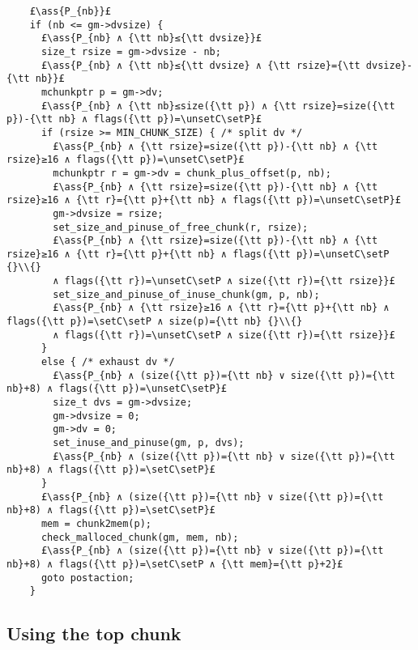 \documentclass[10pt,twoside]{report}
\makeatletter
\newcommand{\ml}[2][t]{\mbox{\mdseries\begin{tabular}[#1]{@{}L@{}}#2\end{tabular}}}
\newcommand{\ass}[1]{\ensuremath{{\color{blue}\left\{\ml[c]{#1}\right\}}}}
\newcommand{\setC}{\raisebox{1.5pt}{$\blacktriangledown$}}
\newcommand{\unsetC}{\raisebox{1.5pt}{$\triangledown$}}
\newcommand{\setP}{{\blacktriangle}}
\makeatother
\begin{document}
\begin{lstlisting}
    £\ass{P_{nb}}£
    if (nb <= gm->dvsize) {
      £\ass{P_{nb} ∧ {\tt nb}≤{\tt dvsize}}£
      size_t rsize = gm->dvsize - nb;
      £\ass{P_{nb} ∧ {\tt nb}≤{\tt dvsize} ∧ {\tt rsize}={\tt dvsize}-{\tt nb}}£
      mchunkptr p = gm->dv;
      £\ass{P_{nb} ∧ {\tt nb}≤size({\tt p}) ∧ {\tt rsize}=size({\tt p})-{\tt nb} ∧ flags({\tt p})=\unsetC\setP}£
      if (rsize >= MIN_CHUNK_SIZE) { /* split dv */
        £\ass{P_{nb} ∧ {\tt rsize}=size({\tt p})-{\tt nb} ∧ {\tt rsize}≥16 ∧ flags({\tt p})=\unsetC\setP}£
        mchunkptr r = gm->dv = chunk_plus_offset(p, nb);
        £\ass{P_{nb} ∧ {\tt rsize}=size({\tt p})-{\tt nb} ∧ {\tt rsize}≥16 ∧ {\tt r}={\tt p}+{\tt nb} ∧ flags({\tt p})=\unsetC\setP}£
        gm->dvsize = rsize;
        set_size_and_pinuse_of_free_chunk(r, rsize);
        £\ass{P_{nb} ∧ {\tt rsize}=size({\tt p})-{\tt nb} ∧ {\tt rsize}≥16 ∧ {\tt r}={\tt p}+{\tt nb} ∧ flags({\tt p})=\unsetC\setP {}\\{}
        ∧ flags({\tt r})=\unsetC\setP ∧ size({\tt r})={\tt rsize}}£
        set_size_and_pinuse_of_inuse_chunk(gm, p, nb);
        £\ass{P_{nb} ∧ {\tt rsize}≥16 ∧ {\tt r}={\tt p}+{\tt nb} ∧ flags({\tt p})=\setC\setP ∧ size(p)={\tt nb} {}\\{}
        ∧ flags({\tt r})=\unsetC\setP ∧ size({\tt r})={\tt rsize}}£
      }
      else { /* exhaust dv */
        £\ass{P_{nb} ∧ (size({\tt p})={\tt nb} ∨ size({\tt p})={\tt nb}+8) ∧ flags({\tt p})=\unsetC\setP}£
        size_t dvs = gm->dvsize;
        gm->dvsize = 0;
        gm->dv = 0;
        set_inuse_and_pinuse(gm, p, dvs);
        £\ass{P_{nb} ∧ (size({\tt p})={\tt nb} ∨ size({\tt p})={\tt nb}+8) ∧ flags({\tt p})=\setC\setP}£
      }
      £\ass{P_{nb} ∧ (size({\tt p})={\tt nb} ∨ size({\tt p})={\tt nb}+8) ∧ flags({\tt p})=\setC\setP}£
      mem = chunk2mem(p);
      check_malloced_chunk(gm, mem, nb);
      £\ass{P_{nb} ∧ (size({\tt p})={\tt nb} ∨ size({\tt p})={\tt nb}+8) ∧ flags({\tt p})=\setC\setP ∧ {\tt mem}={\tt p}+2}£
      goto postaction;
    }
\end{lstlisting}

\subsection*{Using the top chunk}
\end{document}
